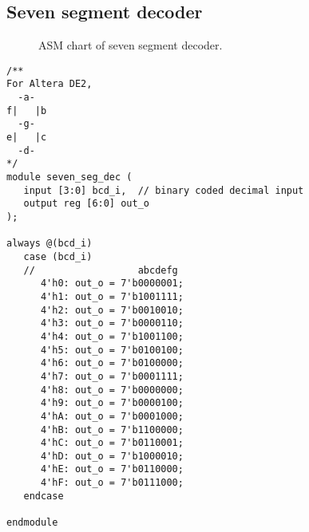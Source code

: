 \subsection{Seven segment decoder}

\begin{figure}[htbp]
   \centering
   
   \caption{ASM chart of seven segment decoder.}
   \label{fig:seven_segment_decoder_asm}
\end{figure}

\begin{verbatim}
/**
For Altera DE2,
  -a-
f|   |b
  -g-
e|   |c
  -d-
*/
module seven_seg_dec (
   input [3:0] bcd_i,  // binary coded decimal input
   output reg [6:0] out_o
);

always @(bcd_i)
   case (bcd_i)
   //                  abcdefg
      4'h0: out_o = 7'b0000001;
      4'h1: out_o = 7'b1001111;
      4'h2: out_o = 7'b0010010;
      4'h3: out_o = 7'b0000110;
      4'h4: out_o = 7'b1001100;
      4'h5: out_o = 7'b0100100;
      4'h6: out_o = 7'b0100000;
      4'h7: out_o = 7'b0001111;
      4'h8: out_o = 7'b0000000;
      4'h9: out_o = 7'b0000100;
      4'hA: out_o = 7'b0001000;
      4'hB: out_o = 7'b1100000;
      4'hC: out_o = 7'b0110001;
      4'hD: out_o = 7'b1000010;
      4'hE: out_o = 7'b0110000;
      4'hF: out_o = 7'b0111000;
   endcase

endmodule
\end{verbatim}
